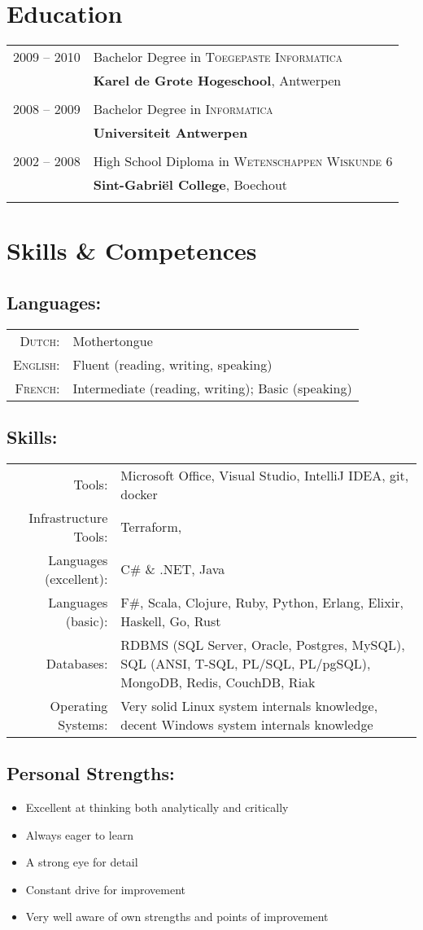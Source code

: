 \documentclass[a4paper,10pt]{article}
\begin{document}
\section{Education}
\begin{tabular}{rl}	
2009 – 2010& Bachelor Degree in \textsc{Toegepaste Informatica}\\
&\normalsize\textbf{Karel de Grote Hogeschool}, Antwerpen\\&\\
2008 – 2009& Bachelor Degree in \textsc{Informatica}\\
&\normalsize\textbf{Universiteit Antwerpen}\\&\\
2002 – 2008& High School Diploma in \textsc{Wetenschappen Wiskunde 6}\\
&\normalsize\textbf{Sint-Gabriël College}, Boechout\\&\\
\end{tabular}

\section{Skills \& Competences}

\subsection{Languages:}
\begin{tabular}{rl}
\textsc{Dutch:}&Mothertongue\\
\textsc{English:}&Fluent (reading, writing, speaking)\\
\textsc{French:}&Intermediate (reading, writing); Basic (speaking)\\
\end{tabular}

\subsection{Skills:}
\begin{tabular}{rp{11cm}}
Tools:& Microsoft Office, Visual Studio, IntelliJ IDEA, git, docker\\
Infrastructure Tools:& Terraform,\\
Languages (excellent):& C\# \& .NET, Java\\
Languages (basic):& F\#, Scala, Clojure, Ruby, Python, Erlang, Elixir, Haskell, Go, Rust\\
Databases:& RDBMS (SQL Server, Oracle, Postgres, MySQL), SQL (ANSI, T-SQL, PL/SQL, PL/pgSQL), MongoDB, Redis, CouchDB, Riak\\
Operating Systems:& Very solid Linux system internals knowledge, decent Windows  system internals knowledge
\end{tabular}

\subsection{Personal Strengths:}
\begin{itemize}
\item Excellent at thinking both analytically and critically
\item Always eager to learn
\item A strong eye for detail
\item Constant drive for improvement
\item Very well aware of own strengths and points of improvement
\end{itemize}
\end{document}
